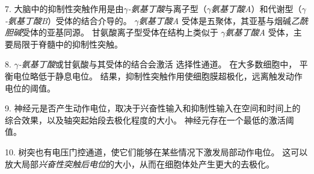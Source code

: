 7. 大脑中的抑制性突触作用是由\textit{$\gamma$-氨基丁酸}与离子型（\textit{$\gamma$氨基丁酸A}）和代谢型（\textit{$\gamma$-氨基丁酸B}）受体的结合介导的。
\textit{$\gamma$氨基丁酸A} 受体是五聚体，其亚基与烟碱\textit{乙酰胆碱}受体的亚基同源。
甘氨酸离子型受体在结构上类似于 \textit{$\gamma$氨基丁酸A} 受体，主要局限于脊髓中的抑制性突触。 


8. \textit{$\gamma$-氨基丁酸}或甘氨酸与其受体的结合会激活  选择性通道。
在大多数细胞中， 平衡电位略低于静息电位。
结果，抑制性突触作用使细胞膜超极化，远离触发动作电位的阈值。


9. 神经元是否产生动作电位，取决于兴奋性输入和抑制性输入在空间和时间上的综合效果，以及轴突起始段去极化程度的大小。
神经元存在一个最低的激活阈值。


10. 树突也有电压门控通道，使它们能够在某些情况下激发局部动作电位。
这可以放大局部\textit{兴奋性突触后电位}的大小，从而在细胞体处产生更大的去极化。






